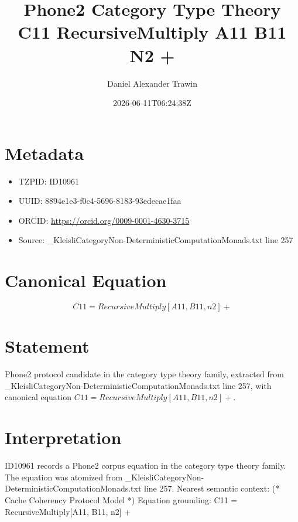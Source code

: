 \documentclass[11pt]{article}
\title{Phone2 Category Type Theory C11 RecursiveMultiply A11 B11 N2 +}
\author{Daniel Alexander Trawin}
\date{2026-06-11T06:24:38Z}
\begin{document}
\maketitle
\section*{Metadata}
\begin{itemize}
\item TZPID: ID10961
\item UUID: 8894e1e3-f0c4-5696-8183-93edecae1faa
\item ORCID: \url{https://orcid.org/0009-0001-4630-3715}
\item Source: _KleisliCategoryNon-DeterministicComputationMonads.txt line 257
\end{itemize}
\section*{Canonical Equation}
\[
C11 = RecursiveMultiply[A11, B11, n2] +
\]
\section*{Statement}
Phone2 protocol candidate in the category type theory family, extracted from _KleisliCategoryNon-DeterministicComputationMonads.txt line 257, with canonical equation $C11 = RecursiveMultiply[A11, B11, n2] +$.
\section*{Interpretation}
ID10961 records a Phone2 corpus equation in the category type theory family. The equation was atomized from _KleisliCategoryNon-DeterministicComputationMonads.txt line 257. Nearest semantic context: (* Cache Coherency Protocol Model *) Equation grounding: C11 = RecursiveMultiply[A11, B11, n2] +
\end{document}
